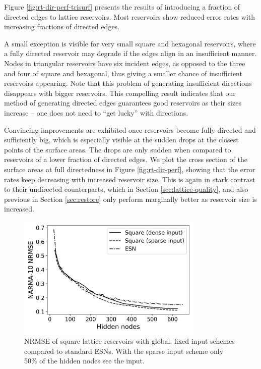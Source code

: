Figure \ref{fig:rt-dir-perf-trisurf} presents the results of introducing a
fraction of directed edges to lattice reservoirs. Most reservoirs show reduced
error rates with increasing fractions of directed edges.

A small exception is visible for very small square and hexagonal reservoirs,
where a fully directed reservoir may degrade if the edges align in an
insufficient manner. Nodes in triangular reservoirs have six incident edges, as
opposed to the three and four of square and hexagonal, thus giving a smaller
chance of insufficient reservoirs appearing. Note that this problem of
generating insufficient directions disappears with bigger reservoirs. This
compelling result indicates that our method of generating directed edges
guarantees good reservoirs as their sizes increase -- one does not need to ``get
lucky'' with directions.

Convincing improvements are exhibited once reservoirs become fully directed and
sufficiently big, which is especially visible at the sudden drops at the closest
points of the surface areas. The drops are only sudden when compared to
reservoirs of a lower fraction of directed edges. We plot the cross section of
the surface areas at full directedness in Figure \ref{fig:rt-dir-perf}, showing
that the error rates keep decreasing with increased reservoir size. This is
again in stark contrast to their undirected counterparts, which in Section
\ref{sec:lattice-quality}, and also previous in Section \ref{sec:restore} only
perform marginally better as reservoir size is increased.

\begin{figure}
  \centering
  \includegraphics[width=3.5in]{figures/rt-performance-big.png}
  \caption{
    NRMSE of square lattice reservoirs with global, fixed input schemes compared
to standard ESNs. With the sparse input scheme only 50\% of the hidden nodes see
the input.
  }
  \label{fig:rt-performance-big}
\end{figure}

